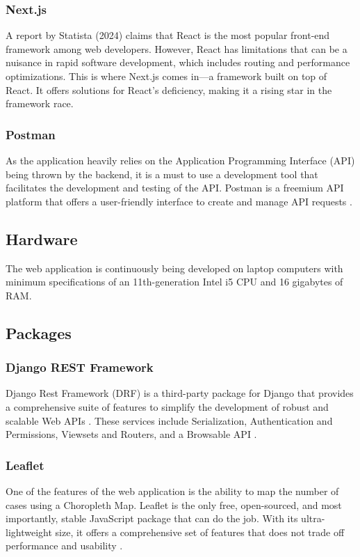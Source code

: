 \subsubsection{Next.js}
A report by Statista (2024) claims that React is the most popular front-end framework among web developers. However, React has limitations that can be a nuisance in rapid software development, which includes routing and performance optimizations. This is where Next.js comes in—a framework built on top of React. It offers solutions for React's deficiency, making it a rising star in the framework race. 

\subsubsection{Postman}
As the application heavily relies on the Application Programming Interface (API) being thrown by the backend, it is a must to use a development tool that facilitates the development and testing of the API. Postman is a freemium API platform that offers a user-friendly interface to create and manage API requests \cite{postman-no-date}. 

\subsection{Hardware}
The web application is continuously being developed on laptop computers with minimum specifications of an 11th-generation Intel i5 CPU and 16 gigabytes of RAM.

\subsection{Packages}

\subsubsection{Django REST Framework}
Django Rest Framework (DRF) is a third-party package for Django that provides a comprehensive suite of features to simplify the development of robust and scalable Web APIs \cite{christie-no-date}. These services include Serialization, Authentication and Permissions, Viewsets and Routers, and a Browsable API . 

\subsubsection{Leaflet}
One of the features of the web application is the ability to map the number of cases using a Choropleth Map. Leaflet is the only free, open-sourced, and most importantly, stable JavaScript package that can do the job. With its ultra-lightweight size, it offers a comprehensive set of features that does not trade off performance and usability \cite{leaflet-no-date}. 

